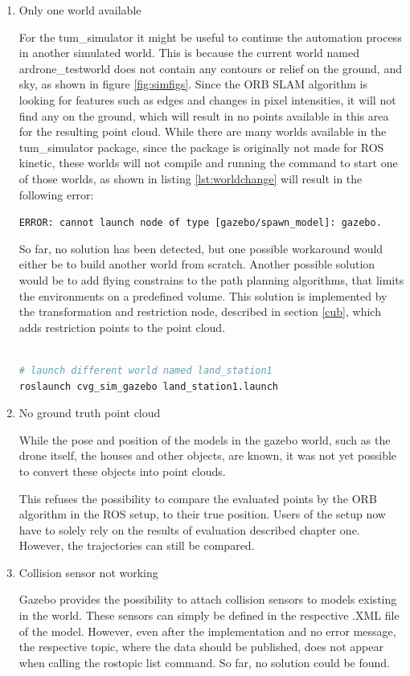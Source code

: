	\begin{enumerate}
	
	\item{Only one world available}
	
	For the tum\_simulator it might be useful to continue the automation process in another simulated world. This is because the current world named ardrone\_testworld
	does not contain any contours or relief on the ground, and sky, as shown in figure \ref{fig:simfigs}. Since the ORB SLAM algorithm is looking for features such as edges and changes in pixel intensities, 
	it will not find any on the ground, which will result in no points available in this area for the resulting point cloud. While there are many worlds available in the 
	tum\_simulator package, since the package is originally not made for ROS kinetic, these worlds will not compile and running the command to start one of those worlds, 
	as shown in listing \ref{lst:worldchange} will result in the following error: 
	
	\texttt{ERROR: cannot launch node of type [gazebo/spawn\_model]: gazebo.}
	
	So far, no solution has been detected, but one possible workaround would either be to build another world from scratch. Another possible solution would be to add flying 
	constrains to the path planning algorithms, that limits the environments on a predefined volume. This solution is implemented by the transformation and restriction node, described in section 
	\ref{cub}, which adds restriction points to the point cloud. 
	
	
\begin{lstlisting}[language=bash, caption= Launching different world, label=lst:worldchange]
	
# launch different world named land_station1
roslaunch cvg_sim_gazebo land_station1.launch

\end{lstlisting}

	\item{No ground truth point cloud}
	
	While the pose and position of the models in the gazebo world, such as the drone itself, the houses and other objects, are known, it was not yet possible 
	to convert these objects into point clouds. 
	
	This refuses the possibility to compare the evaluated points by the ORB algorithm in the ROS setup, to their true position. Users of the setup now have to solely
	rely on the results of evaluation described chapter one. However, the trajectories can still be compared.
	
	\item{Collision sensor not working}

	Gazebo provides the possibility to attach collision sensors to models existing in the world. These sensors can simply be defined in the respective 
	.XML file of the model. However, even after the implementation and no error message, the respective topic, where the data should be published, 
	does not appear when calling the rostopic list command. So far, no solution could be found. 

	\end{enumerate}